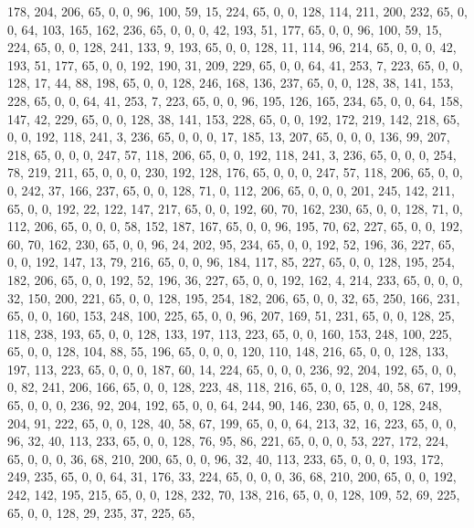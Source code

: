\begin{DoxyCode}
       178, 204, 206, 65, 0, 0, 96, 100, 59, 15, 224, 65, 0, 0, 128, 114, 211, 200, 232, 65, 0, 0, 64, 103, 165,
       162, 236, 65, 0, 0, 0, 42, 193, 51, 177, 65, 0, 0, 96, 100, 59, 15, 224, 65, 0, 0, 128, 241, 133, 9, 193, 65,
       0, 0, 128, 11, 114, 96, 214, 65, 0, 0, 0, 42, 193, 51, 177, 65, 0, 0, 192, 190, 31, 209, 229, 65, 0, 0, 64,
       41, 253, 7, 223, 65, 0, 0, 128, 17, 44, 88, 198, 65, 0, 0, 128, 246, 168, 136, 237, 65, 0, 0, 128, 38, 141,
       153, 228, 65, 0, 0, 64, 41, 253, 7, 223, 65, 0, 0, 96, 195, 126, 165, 234, 65, 0, 0, 64, 158, 147, 42, 229,
       65, 0, 0, 128, 38, 141, 153, 228, 65, 0, 0, 192, 172, 219, 142, 218, 65, 0, 0, 192, 118, 241, 3, 236, 65, 0,
       0, 0, 17, 185, 13, 207, 65, 0, 0, 0, 136, 99, 207, 218, 65, 0, 0, 0, 247, 57, 118, 206, 65, 0, 0, 192, 118,
       241, 3, 236, 65, 0, 0, 0, 254, 78, 219, 211, 65, 0, 0, 0, 230, 192, 128, 176, 65, 0, 0, 0, 247, 57, 118,
       206, 65, 0, 0, 0, 242, 37, 166, 237, 65, 0, 0, 128, 71, 0, 112, 206, 65, 0, 0, 0, 201, 245, 142, 211, 65, 0,
       0, 192, 22, 122, 147, 217, 65, 0, 0, 192, 60, 70, 162, 230, 65, 0, 0, 128, 71, 0, 112, 206, 65, 0, 0, 0, 58,
       152, 187, 167, 65, 0, 0, 96, 195, 70, 62, 227, 65, 0, 0, 192, 60, 70, 162, 230, 65, 0, 0, 96, 24, 202, 95,
       234, 65, 0, 0, 192, 52, 196, 36, 227, 65, 0, 0, 192, 147, 13, 79, 216, 65, 0, 0, 96, 184, 117, 85, 227, 65,
       0, 0, 128, 195, 254, 182, 206, 65, 0, 0, 192, 52, 196, 36, 227, 65, 0, 0, 192, 162, 4, 214, 233, 65, 0, 0, 0,
       32, 150, 200, 221, 65, 0, 0, 128, 195, 254, 182, 206, 65, 0, 0, 32, 65, 250, 166, 231, 65, 0, 0, 160, 153,
       248, 100, 225, 65, 0, 0, 96, 207, 169, 51, 231, 65, 0, 0, 128, 25, 118, 238, 193, 65, 0, 0, 128, 133, 197,
       113, 223, 65, 0, 0, 160, 153, 248, 100, 225, 65, 0, 0, 128, 104, 88, 55, 196, 65, 0, 0, 0, 120, 110, 148,
       216, 65, 0, 0, 128, 133, 197, 113, 223, 65, 0, 0, 0, 187, 60, 14, 224, 65, 0, 0, 0, 236, 92, 204, 192, 65, 0,
       0, 0, 82, 241, 206, 166, 65, 0, 0, 128, 223, 48, 118, 216, 65, 0, 0, 128, 40, 58, 67, 199, 65, 0, 0, 0, 236,
       92, 204, 192, 65, 0, 0, 64, 244, 90, 146, 230, 65, 0, 0, 128, 248, 204, 91, 222, 65, 0, 0, 128, 40, 58, 67,
       199, 65, 0, 0, 64, 213, 32, 16, 223, 65, 0, 0, 96, 32, 40, 113, 233, 65, 0, 0, 128, 76, 95, 86, 221, 65, 0,
       0, 0, 53, 227, 172, 224, 65, 0, 0, 0, 36, 68, 210, 200, 65, 0, 0, 96, 32, 40, 113, 233, 65, 0, 0, 0, 193,
       172, 249, 235, 65, 0, 0, 64, 31, 176, 33, 224, 65, 0, 0, 0, 36, 68, 210, 200, 65, 0, 0, 192, 242, 142, 195,
       215, 65, 0, 0, 128, 232, 70, 138, 216, 65, 0, 0, 128, 109, 52, 69, 225, 65, 0, 0, 128, 29, 235, 37, 225, 65,

\end{DoxyCode}
